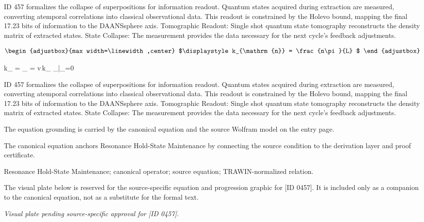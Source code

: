 ID 457 formalizes the collapse of superpositions for information readout. Quantum states acquired during extraction are measured, converting atemporal correlations into classical observational data. This readout is constrained by the Holevo bound, mapping the final 17.23 bits of information to the DAANSsphere axis. Tomographic Readout: Single shot quantum state tomography reconstructs the density matrix of extracted states. State Collapse: The measurement provides the data necessary for the next cycle's feedback adjustments.

\[
\begin{adjustbox}{max width=\linewidth,center}
$\displaystyle
k_{\mathrm{n}} = \frac{n\pi}{L}
$
\end{adjustbox}
\]

\tzpequationlinks
  {k_{} = }
  {\omega_{} = v\,k_{}}
  {\Phi_{}|_{\partial\Omega}=0}

ID 457 formalizes the collapse of superpositions for information readout. Quantum states acquired during extraction are measured, converting atemporal correlations into classical observational data. This readout is constrained by the Holevo bound, mapping the final 17.23 bits of information to the DAANSsphere axis. Tomographic Readout: Single shot quantum state tomography reconstructs the density matrix of extracted states. State Collapse: The measurement provides the data necessary for the next cycle's feedback adjustments.

The equation grounding is carried by the canonical equation and the source Wolfram model on the entry page.

The canonical equation anchors Resonance Hold-State Maintenance by connecting the source condition to the derivation layer and proof certificate.

Resonance Hold-State Maintenance; canonical operator; source equation; TRAWIN-normalized relation.
\endgroup

\begingroup\footnotesize\sloppy
The visual plate below is reserved for the source-specific equation and progression graphic for [ID 0457]. It is included only as a companion to the canonical equation, not as a substitute for the formal text.
\par\endgroup
\begingroup\footnotesize\itshape
Visual plate pending source-specific approval for [ID 0457].
\par\endgroup

